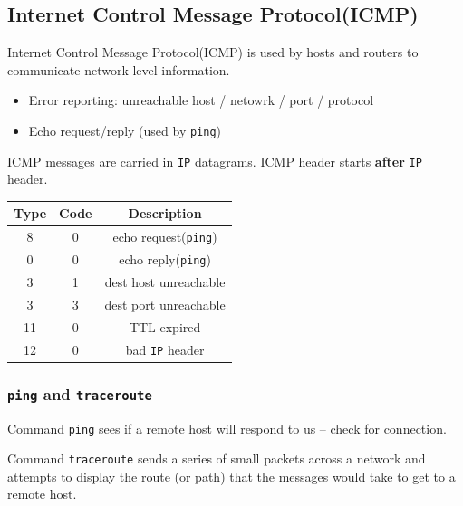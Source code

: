 \documentclass[12pt]{article}
\newcommand\IP{\texttt{IP} }
\theoremstyle{definition}
\begin{document}
\subsection{Internet Control Message Protocol(ICMP)}
Internet Control Message Protocol(ICMP) is used by hosts and routers to communicate network-level information.
\begin{itemize}
  \item Error reporting: unreachable host / netowrk / port / protocol
  \item Echo request/reply (used by \texttt{ping})
\end{itemize}
ICMP messages are carried in \IP datagrams. ICMP header starts \textbf{after} \IP header.
\begin{table}[h]
\centering
\begin{tabular}{|c|c|c|}\hline
Type&Code&Description\\\hline
8&0&echo request(\texttt{ping})\\\hline
0&0&echo reply(\texttt{ping})\\\hline
3&1&dest host unreachable\\\hline
3&3&dest port unreachable\\\hline
11&0&TTL expired\\\hline
12&0&bad \IP header\\\hline
\end{tabular}
\end{table}
\subsubsection{\texttt{ping} and \texttt{traceroute}}
Command \texttt{ping} sees if a remote host will respond to us -- check for connection.

Command \texttt{traceroute} sends a series of small packets across a network and attempts to display the route (or path) that the messages would take to get to a remote host.
\clearpage
\end{document}
